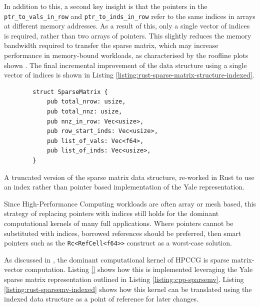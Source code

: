 In addition to this, a second key insight is that the pointers in the \texttt{ptr_to_vals_in_row} and \texttt{ptr_to_inds_in_row} refer to the same indices in arrays at different memory addresses. As a result of this, only a single vector of indices is required, rather than two arrays of pointers. This slightly reduces the memory bandwidth required to transfer the sparse matrix, which may increase performance in memory-bound workloads, as characterised by the roofline plots shown . The final incremental improvement of the data structure using a single vector of indices is shown in Listing \ref{listing:rust-sparse-matrix-structure-indexed}.

\begin{code}
    \begin{verbatim}
        struct SparseMatrix {
            pub total_nrow: usize,
            pub total_nnz: usize,
            pub nnz_in_row: Vec<usize>,
            pub row_start_inds: Vec<usize>,
            pub list_of_vals: Vec<f64>,
            pub list_of_inds: Vec<usize>,
        }
    \end{verbatim}
    \caption{A truncated version of the sparse matrix data structure, re-worked in Rust to use an index rather than pointer based implementation of the Yale representation.}
    \label{listing:rust-sparse-matrix-structure-indexed}
\end{code}

Since High-Performance Computing workloads are often array or mesh based, this strategy of replacing pointers with indices still holds for the dominant computational kernels of many full applications. Where pointers cannot be substituted with indices, borrowed references should be preferred, then smart pointers such as the \texttt{Rc<RefCell<f64>>} construct as a worst-case solution.

As discussed in , the dominant computational kernel of HPCCG is sparse matrix-vector computation. Listing \ref{} shows how this is implemented leveraging the Yale sparse matrix representation outlined in Listing \ref{listing:cpp-sparsemv}. Listing \ref{listing:rust-sparsemv-indexed} shows how this kernel can be translated using the indexed data structure as a point of reference for later changes.

